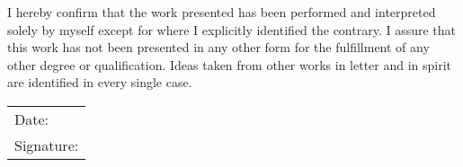 \documentclass[12pt, a4paper, bibtotoc]{scrartcl}
\theoremstyle{break}
\begin{document}

\newpage
\thispagestyle{empty}  %
\null\vfill            %
\begin{center}
I hereby confirm that the work presented has been performed and interpreted solely by
myself except for where I explicitly identified the contrary. I assure that this work has
not been presented in any other form for the fulfillment of any other degree or
qualification. Ideas taken from other works in letter and in spirit are identified
in every single case.
\end{center}

\vspace{2cm} %

\begin{flushright}
\begin{tabular}{p{8cm}}
Date: \underline{\hspace{3cm}} \\ [1.0ex]
Signature: \underline{\hspace{3cm}}
\end{tabular}
\end{flushright}

\vfill\null
\newpage
\end{document}
